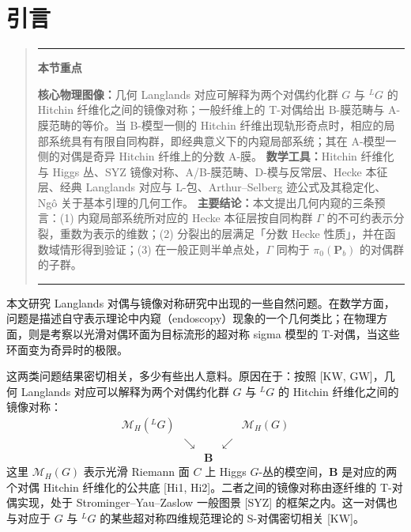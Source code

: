 \documentclass[11pt,a4paper]{article}
\newenvironment{keytakeaway}
  {\par\medskip\begin{quote}\small\noindent
   \rule{\linewidth}{0.6pt}\par\nopagebreak\smallskip\noindent
   \textbf{本节重点}\par\nobreak\smallskip\noindent\ignorespaces}
  {\par\smallskip\noindent\rule{\linewidth}{0.6pt}\end{quote}\medskip}
\begin{document}
\clearpage
\tableofcontents
\clearpage



\section{引言}

\begin{keytakeaway}
\textbf{核心物理图像：}几何 Langlands 对应可解释为两个对偶约化群 $G$ 与 ${}^{L}G$ 的 Hitchin 纤维化之间的镜像对称；一般纤维上的 T-对偶给出 B-膜范畴与 A-膜范畴的等价。当 B-模型一侧的 Hitchin 纤维出现轨形奇点时，相应的局部系统具有有限自同构群，即经典意义下的内窥局部系统；其在 A-模型一侧的对偶是奇异 Hitchin 纤维上的分数 A-膜。
\textbf{数学工具：}Hitchin 纤维化与 Higgs 丛、SYZ 镜像对称、A/B-膜范畴、D-模与反常层、Hecke 本征层、经典 Langlands 对应与 L-包、Arthur--Selberg 迹公式及其稳定化、Ngô 关于基本引理的几何工作。
\textbf{主要结论：}本文提出几何内窥的三条预言：(1) 内窥局部系统所对应的 Hecke 本征层按自同构群 $\Gamma$ 的不可约表示分裂，重数为表示的维数；(2) 分裂出的层满足「分数 Hecke 性质」，并在函数域情形得到验证；(3) 在一般正则半单点处，$\Gamma$ 同构于 $\pi_0(\boldsymbol{P}_b)$ 的对偶群的子群。
\end{keytakeaway}

本文研究 Langlands 对偶与镜像对称研究中出现的一些自然问题。在数学方面，问题是描述自守表示理论中内窥（endoscopy）现象的一个几何类比；在物理方面，则是考察以光滑对偶环面为目标流形的超对称 sigma 模型的 T-对偶，当这些环面变为奇异时的极限。

这两类问题结果密切相关，多少有些出人意料。原因在于：按照 [KW, GW]，几何 Langlands 对应可以解释为两个对偶约化群 $G$ 与 ${}^{L}G$ 的 Hitchin 纤维化之间的镜像对称：
\[
\begin{array}{ccccc}
\mathcal{M}_H({}^{L}G) & & & & \mathcal{M}_H(G)\\[2pt]
& \searrow & & \swarrow & \\[2pt]
& & \boldsymbol{B} & &
\end{array}
\]
这里 $\mathcal{M}_H(G)$ 表示光滑 Riemann 面 $C$ 上 Higgs $G$-丛的模空间，$\boldsymbol{B}$ 是对应的两个对偶 Hitchin 纤维化的公共底 [Hi1, Hi2]。二者之间的镜像对称由逐纤维的 T-对偶实现，处于 Strominger--Yau--Zaslow 一般图景 [SYZ] 的框架之内。这一对偶也与对应于 $G$ 与 ${}^{L}G$ 的某些超对称四维规范理论的 S-对偶密切相关 [KW]。
\end{document}
